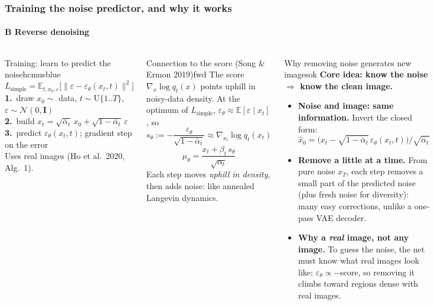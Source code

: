 \documentclass[aspectratio=169,9pt,xcolor=table]{beamer}
\newcommand{\E}{\mathbb{E}}
\newcommand{\Normal}{\mathcal{N}}
\newcommand{\Id}{\mathbf{I}}
\newcommand{\eps}{\varepsilon}
\newcommand{\ab}{\bar{\alpha}}
\begin{document}
\begin{frame}
\frametitle{Training the noise predictor, and why it works}
\framesubtitle{B \textperiodcentered{} Reverse denoising}
\begin{columns}[T,onlytextwidth]
\begin{tbox}[fontupper=\footnotesize]{Training: learn to predict the noise}{hcmusblue}
\setlength{\abovedisplayskip}{1pt}\setlength{\belowdisplayskip}{2pt}
\[L_{\text{simple}}=\E_{t,x_0,\eps}\big[\|\eps-\eps_\theta(x_t,t)\|^2\big]\]
\textbf{1.}~draw $x_0\sim$ data, $t\sim\mathrm{U}\{1..T\}$, $\eps\sim\Normal(0,\Id)$\\
\textbf{2.}~build $x_t=\sqrt{\ab_t}\,x_0+\sqrt{1-\ab_t}\,\eps$\\
\textbf{3.}~predict $\eps_\theta(x_t,t)$; gradient step on the error\\[0.5mm]
{\scriptsize\color{muted}Uses real images (Ho et al.\ 2020, Alg.~1).}
\end{tbox}
\begin{tbox}[fontupper=\footnotesize,after skip=0pt]{Connection to the score (Song \& Ermon 2019)}{fwd}
\setlength{\abovedisplayskip}{1pt}\setlength{\belowdisplayskip}{1pt}
The score $\nabla_x\log q_t(x)$ points uphill in noisy-data density. At the optimum of $L_{\text{simple}}$, \mbox{$\eps_\theta\approx\E[\eps\mid x_t]$}, so
\[s_\theta:=-\frac{\eps_\theta}{\sqrt{1-\ab_t}}\approx\nabla_{x_t}\log q_t(x_t)\]
\[\mu_\theta=\frac{x_t+\beta_t\,s_\theta}{\sqrt{\alpha_t}}\]
Each step moves \emph{uphill in density}, then adds noise: like annealed Langevin dynamics.
\end{tbox}
\begin{tbox}[fontupper=\footnotesize,before skip=0pt,after skip=0pt]{Why removing noise generates new images}{ok}
\setlength{\abovedisplayskip}{1pt}\setlength{\belowdisplayskip}{1pt}
\textbf{Core idea: know the noise $\Rightarrow$ know the clean image.}
\begin{itemize}\setlength{\itemsep}{2.2pt}
\item \textbf{Noise and image: same information.} Invert the closed form:
\[\hat x_0=\big(x_t-\sqrt{1-\ab_t}\,\eps_\theta(x_t,t)\big)/\sqrt{\ab_t}\]
\item \textbf{Remove a little at a time.} From pure noise $x_T$, each step removes a small part of the predicted noise (plus fresh noise for diversity): many easy corrections, unlike a one-pass VAE decoder.
\item \textbf{Why a \emph{real} image, not any image.} To guess the noise, the net must know what real images look like; $\eps_\theta\propto-$score, so removing it climbs toward regions dense with real images.

\end{itemize}
\end{tbox}
\end{columns}
\end{frame}
\end{document}
